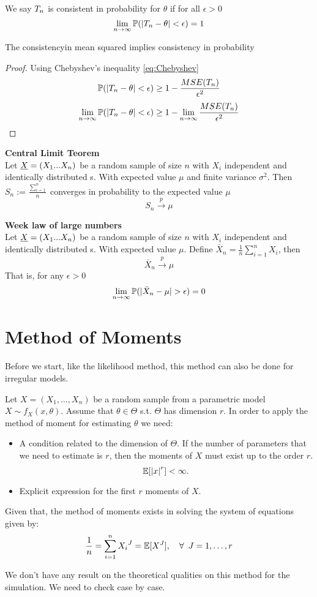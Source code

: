 \begin{defi}
	We say $T_{n}$ is consistent in probability for $\theta$ if for all $\epsilon >0$
	$$\lim_{n\to \infty}\mathbb{P}(|T_{n}-\theta|<\epsilon)=1$$
\end{defi}
\begin{prop}
	The  consistencyin mean squared implies consistency in probability 
\end{prop}
\begin{proof}
	Using Chebyshev's inequality \ref{eq:Chebyshev}
	$$\mathbb{P}(|T_{n}-\theta|<\epsilon)\geq 1-\frac{MSE(T_{n})}{\epsilon^2}$$
	$$\lim_{n\to \infty}\mathbb{P}(|T_{n}-\theta|<\epsilon)\geq 1-\lim_{n\to \infty}\frac{MSE(T_{n})}{\epsilon^2}$$
\end{proof}
\begin{teo}
	\textbf{Central Limit Teorem}\\
	Let $\underline X=(X_1... X_n)$ be a random sample of size $n$ with $X_i$ independent and identically distributed \rv s. With  expected value $\mu$ and finite variance $\sigma^2$. Then $S_n:=\frac{\sum_{i=1}^n}{n}$ converges in probability to the expected value $\mu$
	$$S_n\xrightarrow{p} \mu$$
\end{teo}

\begin{teo}
	\textbf{Week law of large numbers}\\
	Let $\underline X=(X_1... X_n)$ be a random sample of size $n$ with $X_i$ independent and identically distributed \rv s. With  expected value $\mu$.
	Define $\bar X_n=\frac{1}{n}\sum_{i=1}^{n}X_i$, then
	$$\bar X_n \xrightarrow{p} \mu$$
	That is, for any $\epsilon>0$
	$$\lim_{n\to \infty}\p(|\bar X_n- \mu|>\epsilon)=0$$
\end{teo}


	\section{Method of Moments}

\begin{oss}
	Before we start, like the likelihood method, this method can also be done for irregular models.
\end{oss}


Let $X=(X_1,\ldots,X_n)$ be a random sample from a parametric model $X\sim f_X(x,\theta)$.
Assume that $\theta\in\Theta$ s.t. $\Theta$ has dimension $r$. In order to apply the method of moment for estimating $\theta$ we need: 
\begin{itemize}
	\item
	A condition related to the dimension of $\Theta$. If the number of parameters that we need to estimate is $r$, then the moments of $X$ must exist up to the order $r$.
	$$\mathbb{E}[{|x|}^r]<\infty.$$
	\item
	Explicit expression for the first $r$ moments of $X$.
\end{itemize}
Given that, the method of moments exists in solving the system of equations given by:
$$\frac{1}{n}=\sum_{i=1}^{n}{X_i}^{J}=\mathbb{E}[X^{J}], \quad \forall\enspace J=1,\ldots,r$$
\begin{oss}
	We don't have any result on the theoretical qualities on this method for the simulation. We need to check case by case.
\end{oss}

